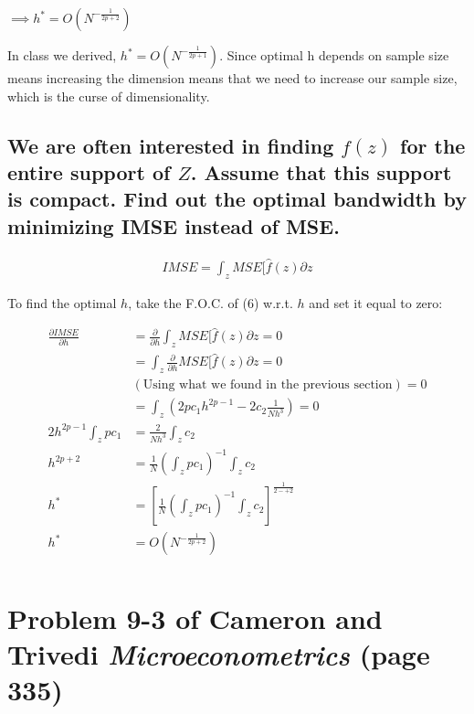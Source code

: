 \documentclass[11pt]{article}
\theoremstyle{definition}
\begin{document}
\noindent
$\implies h^{*}=O\left(N^{-\frac{1}{2p+2}}\right)$

\noindent
In class we derived, $ h^{*}=O\left(N^{-\frac{1}{2p+1}}\right)$.  Since optimal h depends on sample size means increasing the dimension means that we need to increase our sample size, which is the curse of dimensionality.

\subsection{We are often interested in finding $f(z)$ for the entire support of $Z$.  Assume that this support is compact.  Find out the optimal bandwidth by minimizing IMSE instead of MSE.}

\begin{equation}
\begin{split}
IMSE=\int_z MSE[\hat{f}(z)\partial z 
\end{split}
\end{equation}

To find the optimal $h$, take the F.O.C. of (6) w.r.t. $h$ and set it equal to zero:

\begin{equation*}
\begin{split}
\frac{\partial IMSE}{\partial h} &= \frac{\partial}{\partial h} \int_z MSE[\hat{f}(z)\partial z =0 \\
 &=\int_z \frac{\partial}{\partial h} MSE[\hat{f}(z)\partial z =0\\
 & (\text{Using what we found in the previous section}) =0\\ 
 &= \int_z \left(2pc_{1} h^{2p-1}-2c_{2} \frac{1}{Nh^{3}}\right) =0\\
 2h^{2p-1} \int_{z}pc_{1} & = \frac{2}{Nh^{3}} \int_{z} c_{2} \\
 h^{2p+2}&=\frac{1}{N}\left(\int_{z}pc_{1}\right)^{-1} \int_{z}c_2 \\
 h^{*}&=\left[\frac{1}{N}\left(\int_{z}pc_{1}\right)^{-1} \int_{z}c_2\right]^{\frac{1}{2-+2}} \\ 
 h^{*}&=O\left(N^{-\frac{1}{2p+2}}\right) \\
\end{split}
\end{equation*}


\section{Problem 9-3 of Cameron and Trivedi \textit{Microeconometrics} (page 335)}
\end{document}

